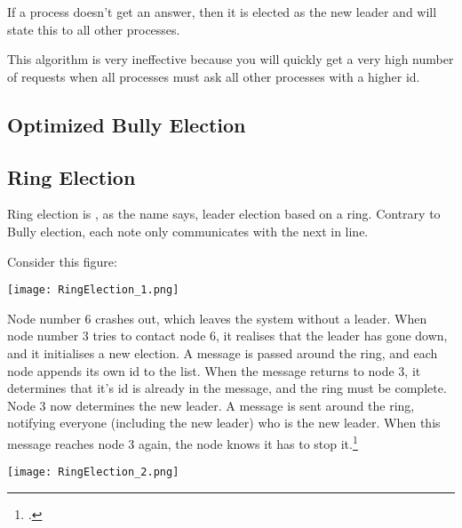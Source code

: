 If a process doesn't get an answer, then it is elected as the new leader and will state this to all other processes.

This algorithm is very ineffective because you will quickly get a very high number of requests when all processes must ask all other processes with a higher id.

\subsection{Optimized Bully Election}

\subsection{Ring Election}
Ring election is , as the name says, leader election based on a ring. Contrary to Bully election, each note only communicates with the next in line.

Consider this figure:

\begin{center}
	\texttt{[image: RingElection\_1.png]}
\end{center}

Node number 6 crashes out, which leaves the system without a leader. When node number 3 tries to contact node 6, it realises that the leader has gone down, and it initialises a new election. A message is passed around the ring, and each node appends its own id to the list. When the message returns to node 3, it determines that it's id is already in the message, and the ring must be complete. Node 3 now determines the new leader. A message is sent around the ring, notifying everyone (including the new leader) who is the new leader. When this message reaches node 3 again, the node knows it has to stop it.\footcite{colostate_RingElec}

\begin{center}
	\texttt{[image: RingElection\_2.png]}
\end{center} 
